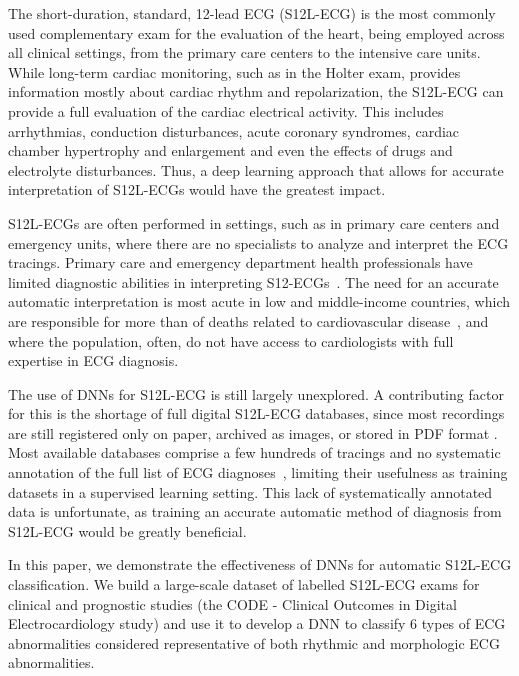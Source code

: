 \documentclass{article}
\begin{document}
The short-duration, standard, 12-lead ECG (S12L-ECG) is the most commonly used complementary exam for the evaluation of the heart, being employed across all clinical settings, from the primary care centers to the intensive care units. While long-term cardiac monitoring, such as in the Holter exam, provides information mostly about cardiac rhythm and repolarization, the S12L-ECG can provide a full evaluation of the cardiac electrical activity. This includes arrhythmias, conduction disturbances, acute coronary syndromes, cardiac chamber hypertrophy and enlargement and even the effects of drugs and electrolyte disturbances. Thus, a deep learning approach that allows for accurate interpretation of S12L-ECGs would have the greatest impact.

S12L-ECGs are often performed in settings, such as in primary care centers and emergency units, where there are no specialists to analyze and interpret the ECG tracings. Primary care and emergency department health professionals have limited diagnostic abilities in interpreting  S12-ECGs~\cite{mant_accuracy_2007, veronese_emergency_2016}. The need for an accurate automatic interpretation is most acute in low and middle-income countries, which are responsible for more than  of deaths related to cardiovascular disease~\cite{worldhealthorganization_global_2014}, and where the population, often, do not have access to cardiologists with full expertise in ECG diagnosis. 

The use of DNNs for S12L-ECG is still largely unexplored. A contributing factor for this is the shortage of full digital S12L-ECG databases, since most recordings are still registered only on paper, archived as images, or stored in PDF format \cite{sassi_pdfecg_2017}. Most available databases comprise a few hundreds of tracings and no systematic annotation of the full list of ECG diagnoses~\cite{lyon_computational_2018}, limiting their usefulness as training datasets in a supervised learning setting. This lack of systematically annotated data is unfortunate, as training an accurate automatic method of diagnosis from S12L-ECG would be greatly beneficial.

In this paper, we demonstrate the effectiveness of DNNs for automatic S12L-ECG classification. We build a large-scale dataset of labelled S12L-ECG exams for clinical and prognostic studies (the CODE - Clinical Outcomes in Digital Electrocardiology study) and use it to develop a DNN to classify 6 types of ECG abnormalities considered representative of both rhythmic and morphologic ECG abnormalities.
\end{document}
